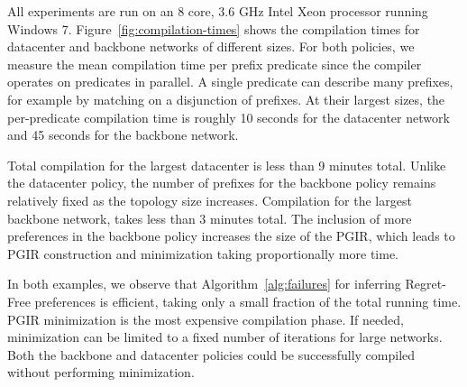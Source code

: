 \documentclass[10pt]{sigalternate052015}
\begin{document}
All experiments are run on an 8 core, 3.6 GHz Intel Xeon processor running Windows 7.
%
Figure~\ref{fig:compilation-times} shows the compilation times for datacenter and backbone networks of different sizes. For both policies, we measure the mean compilation time per prefix predicate since the compiler operates on predicates in parallel. A single predicate can describe many prefixes, for example by matching on a disjunction of prefixes. At their largest sizes, the per-predicate compilation time is roughly 10 seconds for the datacenter network and 45 seconds for the backbone network.


Total compilation for the largest datacenter is less than 9 minutes total. Unlike the datacenter policy, the number of prefixes for the backbone policy remains relatively fixed as the topology size increases. Compilation for the largest backbone network, takes less than 3 minutes total. The inclusion of more preferences in the backbone policy increases the size of the PGIR, which leads to PGIR construction and minimization taking proportionally more time.

In both examples, we observe that Algorithm~\ref{alg:failures} for inferring \textup{Regret-Free} preferences is efficient, taking only a small fraction of the total running time. PGIR minimization is the most expensive compilation phase. If needed, minimization can be limited to a fixed number of iterations for large networks. Both the backbone and datacenter policies could be successfully compiled without performing minimization.

%
\end{document}
